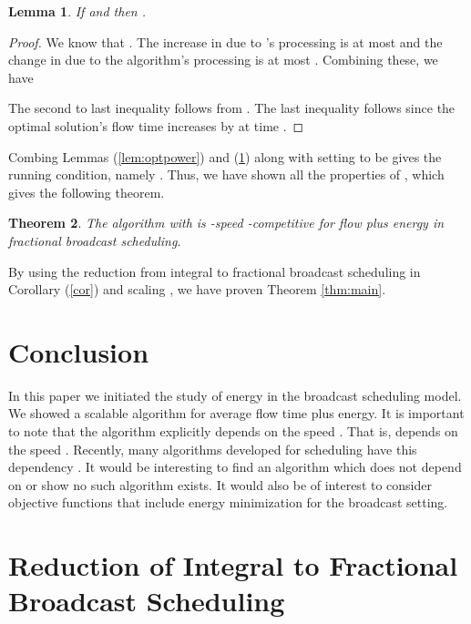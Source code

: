 \documentclass[11pt]{article}
\newtheorem{lemma}{Lemma}[section]
\newtheorem{theorem}[lemma]{Theorem}
\begin{document}
\begin{lemma}\label{lem:main}
If  and  then .
\end{lemma}
\begin{proof}
We know that .  The increase in  due to 's processing is at most  and the change in  due to the algorithm's processing is at most .  Combining these, we have



The second to last inequality follows from .  The last inequality follows since the optimal solution's flow time increases by  at time .
\end{proof}


Combing Lemmas (\ref{lem:optpower}) and (\ref{lem:main}) along with setting  to be  gives the running condition, namely . Thus, we have shown all the properties of , which gives the following theorem.

\begin{theorem}
The algorithm with  is -speed -competitive for flow plus energy in fractional broadcast scheduling.
\end{theorem}

By using  the reduction from integral to fractional broadcast scheduling in Corollary (\ref{cor}) and scaling , we have proven Theorem \ref{thm:main}.



\section{Conclusion}

In this paper we initiated the study of energy in the broadcast scheduling model.  We showed a scalable algorithm for average flow time plus energy.  It is important to note that the algorithm  explicitly depends on the speed . That is,  depends on the speed . Recently,  many algorithms developed for scheduling have this dependency \cite{ChekuriIM09,EdmondsP09,GuptaIKMP10}.  It would be interesting to find an algorithm which does not depend on  or show no such algorithm exists.  It would also be of interest to consider objective functions that include energy minimization for the broadcast setting.






\appendix

\section{Reduction of Integral to Fractional Broadcast Scheduling}\label{sec:red}
\end{document}
